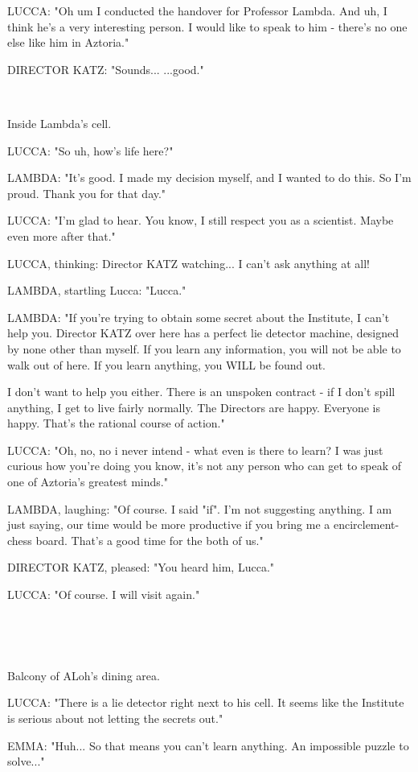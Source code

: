 \documentclass[11pt]{article}
\begin{document}
LUCCA: "Oh um I conducted the handover for Professor Lambda.
And uh, I think he's a very interesting person. 
I would like to speak to him - there's no one else like him in Aztoria."

DIRECTOR KATZ: "Sounds...
...good."

\ 

Inside Lambda's cell.

LUCCA: "So uh, how's life here?"

LAMBDA: "It's good.
I made my decision myself, and I wanted to do this.
So I'm proud. 
Thank you for that day."

LUCCA: "I'm glad to hear. You know, I still respect you as a scientist. Maybe even more after that."

LUCCA, thinking: Director KATZ watching... I can't ask anything at all!

LAMBDA, startling Lucca: "Lucca."

LAMBDA: "If you're trying to obtain some secret about the Institute, I can't help you. 
Director KATZ over here has a perfect lie detector machine, designed by none other than myself.
If you learn any information, you will not be able to walk out of here.
If you learn anything, you WILL be found out.

I don't want to help you either. 
There is an unspoken contract - if I don't spill anything, I get to live fairly normally.
The Directors are happy.
Everyone is happy.
That's the rational course of action."

LUCCA: "Oh, no, no i never intend - what even is there to learn?
I was just curious how you're doing you know, it's not any person who can get to speak of one of Aztoria's greatest minds."

LAMBDA, laughing: "Of course. I said "if". 
I'm not suggesting anything.
I am just saying, our time would be more productive if you bring me a encirclement-chess board. 
That's a good time for the both of us."

DIRECTOR KATZ, pleased: "You heard him, Lucca."

LUCCA: "Of course. I will visit again."

\ 

\ 

Balcony of ALoh's dining area.

LUCCA: "There is a lie detector right next to his cell. 
It seems like the Institute is serious about not letting the secrets out."

EMMA: "Huh... So that means you can't learn anything.
An impossible puzzle to solve..."
\end{document}

